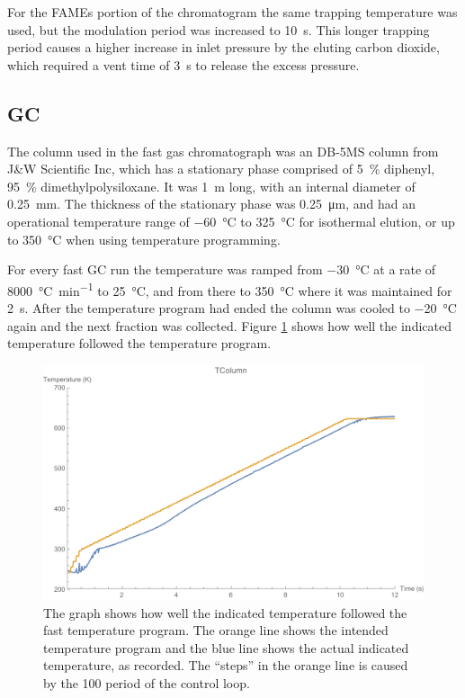 For the FAMEs portion of the chromatogram the same trapping temperature was
used, but the modulation period was increased to \SI{10}{\second}. This longer
trapping period causes a higher increase in inlet pressure by the eluting carbon
dioxide, which required a vent time of \SI{3}{\second} to release the excess
pressure.

\subsection{GC}

The column used in the fast gas chromatograph was an DB-5MS column from J\&W
Scientific Inc, which has a stationary phase comprised of \SI{5}{\percent}
diphenyl, \SI{95}{\percent} dimethylpolysiloxane. It was \SI{1}{\metre} long,
with an internal diameter of \SI{0.25}{\milli\metre}. The thickness of the
stationary phase was \SI{0.25}{\micro\metre}, and had an operational temperature
range of \SI{-60}{\celsius} to \SI{325}{\celsius} for isothermal elution, or up
to \SI{350}{\celsius} when using temperature programming.

For every fast GC run the temperature was ramped from \SI{-30}{\celsius} at a
rate of \SI{8000}{\celsius\per\minute} to \SI{25}{\celsius}, and from there to
\SI{350}{\celsius} where it was maintained for \SI{2}{s}. After the temperature
program had ended the column was cooled to \SI{-20}{\celsius} again and the next
fraction was collected. Figure \ref{fig:Setpoint_Following} shows how well the
indicated temperature followed the temperature program.

\begin{figure}
	\centering
	\includegraphics[width=\textwidth]{Figures/Setpoint_Following.pdf}
	\decoRule	
	
\caption[The fidelity of a fast GC temperature program]{ The graph shows how
well the indicated temperature followed the fast temperature program. The orange
line shows the intended temperature program and the blue line shows the actual
indicated temperature, as recorded. The ``steps'' in the orange line is caused
by the \SI{100}{\milli}{\second} period of the control loop.}

	\label{fig:Setpoint_Following} 
\end{figure}


